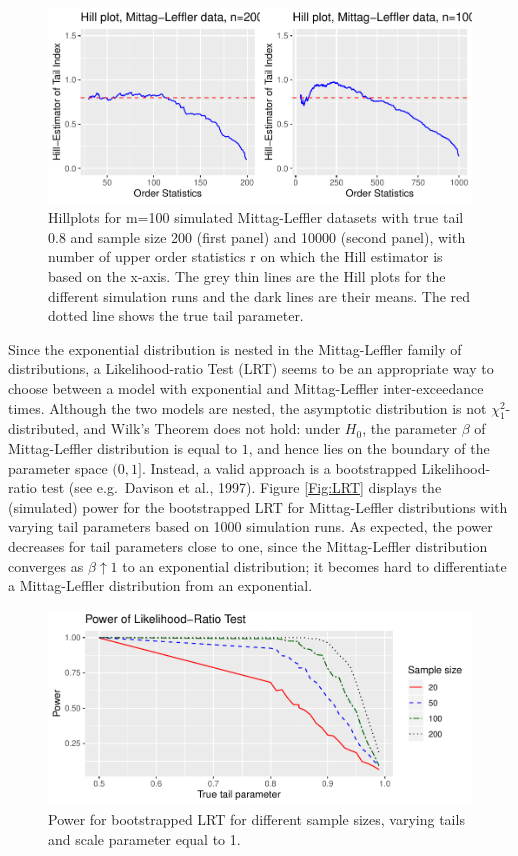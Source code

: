 \documentclass[]{elsarticle} %
\begin{document}
\begin{figure}

{\centering \includegraphics[width=0.5\linewidth]{article_springer_files/figure-latex/Hillplots-1} 

}

\caption{\label{fig:Hillplots} Hillplots for m=100 simulated Mittag-Leffler datasets with true tail 0.8 and sample size 200 (first panel) and 10000 (second panel), with number of upper order statistics r on which the Hill estimator is based on the x-axis. The grey thin lines are the Hill plots for the different simulation runs and the dark lines are their means. The red dotted line shows the true tail parameter. }\label{fig:Hillplots}
\end{figure}

Since the exponential distribution is nested in the Mittag-Leffler
family of distributions, a Likelihood-ratio Test (LRT) seems to be an
appropriate way to choose between a model with exponential and
Mittag-Leffler inter-exceedance times. Although the two models are
nested, the asymptotic distribution is not \(\chi^2_1\)-distributed, and
Wilk's Theorem does not hold: under \(H_0\), the parameter \(\beta\) of
Mittag-Leffler distribution is equal to \(1\), and hence lies on the
boundary of the parameter space \((0,1]\). Instead, a valid approach is
a bootstrapped Likelihood-ratio test (see e.g.~Davison et al., 1997).
Figure \ref{Fig:LRT} displays the (simulated) power for the bootstrapped
LRT for Mittag-Leffler distributions with varying tail parameters based
on 1000 simulation runs. As expected, the power decreases for tail
parameters close to one, since the Mittag-Leffler distribution converges
as \(\beta \uparrow 1\) to an exponential distribution; it becomes hard
to differentiate a Mittag-Leffler distribution from an exponential.

\begin{figure}

{\centering \includegraphics[width=0.9\linewidth]{article_springer_files/figure-latex/LRT_power-1} 

}

\caption{\label{Fig:LRT} Power for bootstrapped LRT for different sample sizes, varying tails and scale parameter equal to 1.}\label{fig:LRT_power}
\end{figure}
\end{document}
